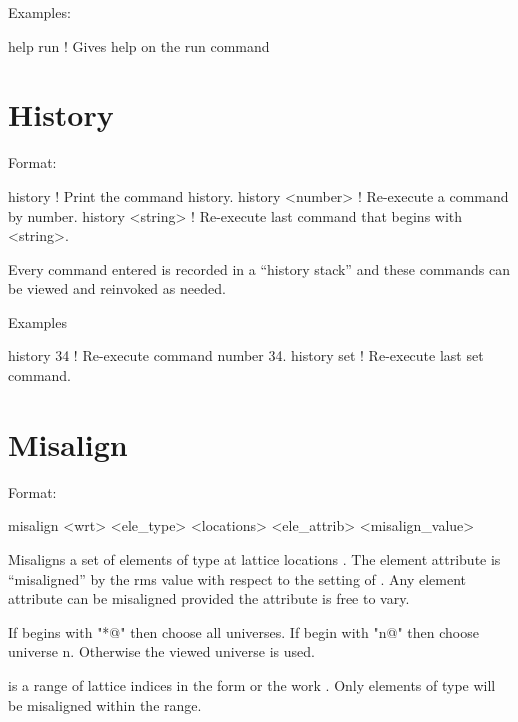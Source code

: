 Examples:
\begin{example}
  help run   ! Gives help on the run command
\end{example}

\section{History}
\label{s:history}

Format:
\begin{example}
  history           ! Print the command history.
  history <number>  ! Re-execute a command by number.
  history <string>  ! Re-execute last command that begins with <string>.
\end{example}

\vskip 0.2in
Every \tao command entered is recorded in a ``history stack'' and
these commands can be viewed and reinvoked as needed. 

Examples
\begin{example}
  history 34   ! Re-execute command number 34.
  history set  ! Re-execute last set command.  
\end{example}

\section{Misalign}
\label{s:misalign}

Format:
\begin{example}
   misalign <wrt> <ele_type> <locations> <ele_attrib> <misalign_value>
\end{example}

\vskip 0.2in
Misaligns a set of elements of type  at lattice
locations .  The element attribute 
is ``misaligned'' by the rms value  with respect
to the setting of . Any element attribute can be misaligned
provided the attribute is free to vary.

If  begins with "*@" then choose all universes. If
 begin with "n@" then choose universe n. Otherwise the
viewed universe is used.

 is a range of lattice indices in the form
 or the work . Only elements of type
 will be misaligned within the range.

